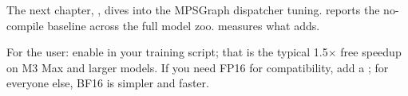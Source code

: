 The next chapter, , dives into the
MPSGraph dispatcher tuning.  reports
the no-compile baseline across the full model zoo.
 measures what
 adds.

\begin{lucidnote}
For the user: enable 
in your training script; that is the typical 1.5$\times$ free
speedup on M3 Max and larger models. If you need FP16 for
compatibility, add a ; for everyone else,
BF16 is simpler and faster.
\end{lucidnote}
